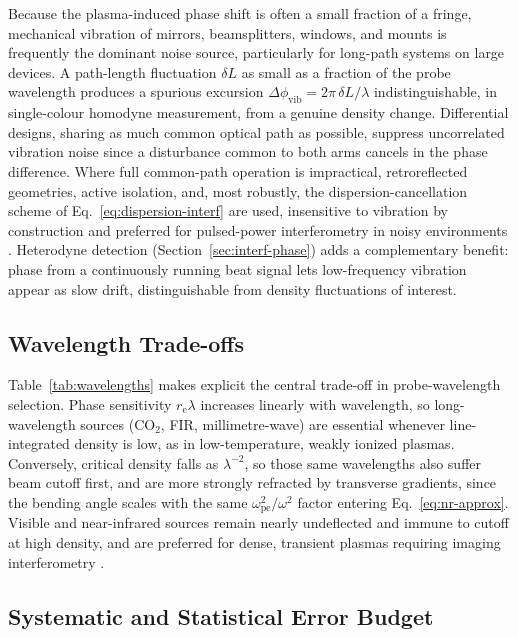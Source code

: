 Because the plasma-induced phase shift is often a small fraction of a fringe, mechanical vibration of mirrors, beamsplitters, windows, and mounts is frequently the dominant noise source, particularly for long-path systems on large devices. A path-length fluctuation $\delta L$ as small as a fraction of the probe wavelength produces a spurious excursion $\Delta\phi_{\mathrm{vib}} = 2\pi\,\delta L/\lambda$ indistinguishable, in single-colour homodyne measurement, from a genuine density change. Differential designs, sharing as much common optical path as possible, suppress uncorrelated vibration noise since a disturbance common to both arms cancels in the phase difference. Where full common-path operation is impractical, retroreflected geometries, active isolation, and, most robustly, the dispersion-cancellation scheme of Eq.~\eqref{eq:dispersion-interf} are used, insensitive to vibration by construction and preferred for pulsed-power interferometry in noisy environments \cite{ref0417}. Heterodyne detection (Section~\ref{sec:interf-phase}) adds a complementary benefit: phase from a continuously running beat signal lets low-frequency vibration appear as slow drift, distinguishable from density fluctuations of interest.

\subsection{Wavelength Trade-offs}

Table~\ref{tab:wavelengths} makes explicit the central trade-off in probe-wavelength selection. Phase sensitivity $r_{\mathrm{e}}\lambda$ increases linearly with wavelength, so long-wavelength sources (CO$_{2}$, FIR, millimetre-wave) are essential whenever line-integrated density is low, as in low-temperature, weakly ionized plasmas. Conversely, critical density falls as $\lambda^{-2}$, so those same wavelengths also suffer beam cutoff first, and are more strongly refracted by transverse gradients, since the bending angle scales with the same $\omega_{\mathrm{pe}}^{2}/\omega^{2}$ factor entering Eq.~\eqref{eq:nr-approx}. Visible and near-infrared sources remain nearly undeflected and immune to cutoff at high density, and are preferred for dense, transient plasmas requiring imaging interferometry \cite{ref0391}.

\subsection{Systematic and Statistical Error Budget}

